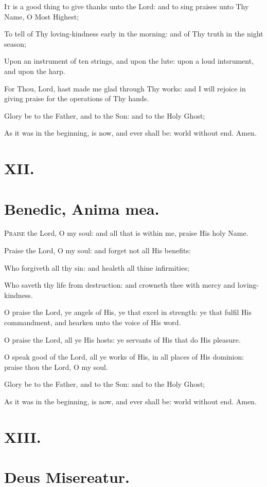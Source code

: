 \lettrine{I}{t} is a good thing to give thanks unto the Lord: and to sing praises unto Thy Name, O Most Highest;

To tell of Thy loving-kindness early in the morning: and of Thy truth in the night season;

Upon an instrument of ten strings, and upon the lute: upon a loud intsrument, and upon the harp.

For Thou, Lord, hast made me glad through Thy works: and I will rejoice in giving praise for the operations of Thy hands.

Glory be to the Father, and to the Son: and to the Holy Ghost;

As it was in the beginning, is now, and ever shall be: world without end. Amen.

\section*{XII.}
\section*{Benedic, Anima mea.}

\lettrine{P}{raise} the Lord, O my soul: and all that is within me, praise His holy Name.

Praise the Lord, O my soul: and forget not all His benefits:

Who forgiveth all thy sin: and healeth all thine infirmities;

Who saveth thy life from destruction: and crowneth thee with mercy and loving-kindness.

O praise the Lord, ye angels of His, ye that excel in strength: ye that fulfil His commandment, and hearken unto the voice of His word.

O praise the Lord, all ye His hosts: ye servants of His that do His pleasure.

O speak good of the Lord, all ye works of His, in all places of His dominion: praise thou the Lord, O my soul.

Glory be to the Father, and to the Son: and to the Holy Ghost;

As it was in the beginning, is now, and ever shall be: world without end. Amen. 

\section*{XIII.}
\section*{Deus Misereatur.}

